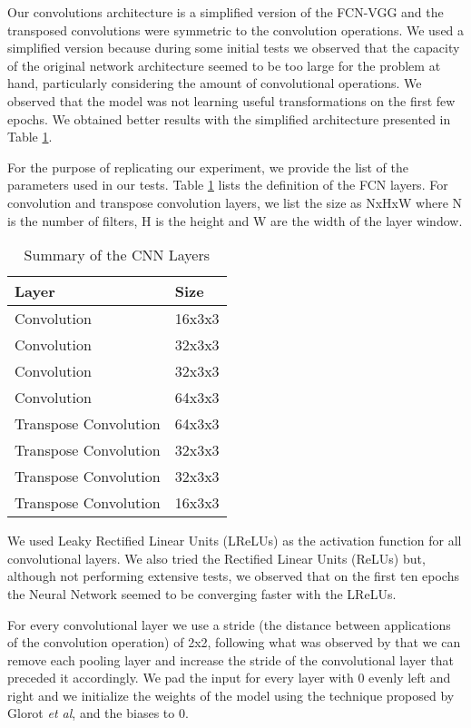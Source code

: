 Our convolutions architecture is a simplified version of the FCN-VGG \cite{long2015fully, simonyan2014very} and the transposed convolutions were symmetric to the convolution operations. We used a simplified version because during some initial tests we observed that the capacity of the original network architecture seemed to be too large for the problem at hand, particularly considering the amount of convolutional operations. We observed that the model was not learning useful transformations on the first few epochs. We obtained better results with the simplified architecture presented in Table \ref{table:cnn-arch}. 

For the purpose of replicating our experiment, we provide the list of the parameters used in our tests. Table \ref{table:cnn-arch} lists the definition of the FCN layers. For convolution and transpose convolution layers, we list the size as NxHxW where N is the number of filters, H is the height and W are the width of the layer window.

\begin{table}[!htb]
\renewcommand{\arraystretch}{1.3}
\caption{Summary of the CNN Layers}
\centering
\begin{tabular}{|l|l|}
\hline
\textbf{Layer}        & \textbf{Size} \\ \hline
Convolution           & 16x3x3        \\ \hline
Convolution           & 32x3x3        \\ \hline
Convolution           & 32x3x3        \\ \hline
Convolution           & 64x3x3        \\ \hline
Transpose Convolution & 64x3x3        \\ \hline
Transpose Convolution & 32x3x3        \\ \hline
Transpose Convolution & 32x3x3        \\ \hline
Transpose Convolution & 16x3x3        \\ \hline
\end{tabular}
\label{table:cnn-arch}
\end{table}

We used Leaky Rectified Linear Units (LReLUs) as the activation function for all convolutional layers. We also tried the Rectified Linear Units (ReLUs) but, although not performing extensive tests, we observed that on the first ten epochs the Neural Network seemed to be converging faster with the LReLUs. 

For every convolutional layer we use a stride (the distance between applications of the convolution operation) of 2x2, following what was observed by \cite{springenberg2014striving} that we can remove each pooling layer and increase the stride of the convolutional layer that preceded it accordingly. We pad the input for every layer with 0 evenly left and right and we initialize the weights of the model using the technique proposed by Glorot \textit{et al}\cite{glorot2010understanding}, and the biases to 0. 

